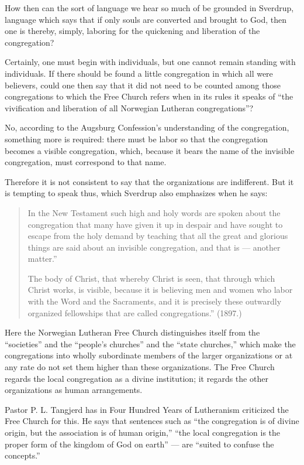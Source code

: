 How then can the sort of language we hear so much of be grounded in Sverdrup, language which says that if only souls are converted and brought to God, then one is thereby, simply, laboring for the quickening and liberation of the congregation?

Certainly, one must begin with individuals, but one cannot remain standing with individuals. If there should be found a little congregation in which all were believers, could one then say that it did not need to be counted among those congregations to which the Free Church refers when in its rules it speaks of “the vivification and liberation of all Norwegian Lutheran congregations”?

No, according to the Augsburg Confession’s understanding of the congregation, something more is required: there must be labor so that the congregation becomes a visible congregation, which, because it bears the name of the invisible congregation, must correspond to that name.

Therefore it is not consistent to say that the organizations are indifferent. But it is tempting to speak thus, which Sverdrup also emphasizes when he says:

\begin{quote}
In the New Testament such high and holy words are spoken about the congregation that many have given it up in despair and have sought to escape from the holy demand by teaching that all the great and glorious things are said about an invisible congregation, and that is — another matter.”

The body of Christ, that whereby Christ is seen, that through which Christ works, is visible, because it is believing men and women who labor with the Word and the Sacraments, and it is precisely these outwardly organized fellowships that are called congregations.” (1897.)
\end{quote}

Here the Norwegian Lutheran Free Church distinguishes itself from the “societies” and the “people’s churches” and the “state churches,” which make the congregations into wholly subordinate members of the larger organizations or at any rate do not set them higher than these organizations. The Free Church regards the local congregation as a divine institution; it regards the other organizations as human arrangements.

Pastor P. L. Tangjerd has in Four Hundred Years of Lutheranism criticized the Free Church for this. He says that sentences such as “the congregation is of divine origin, but the association is of human origin,” “the local congregation is the proper form of the kingdom of God on earth” — are “suited to confuse the concepts.”

